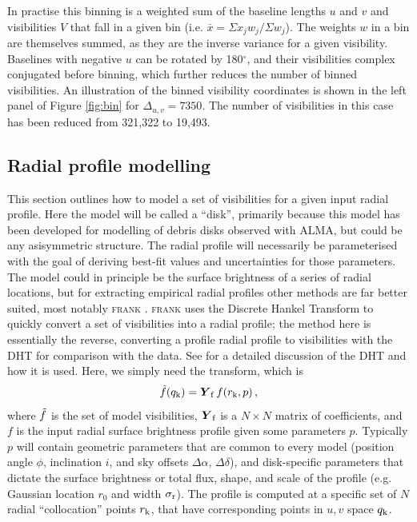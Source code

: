 \documentclass[fleqn,usenatbib]{mnras}
\begin{document}
In practise this binning is a weighted sum of the baseline lengths $u$ and $v$ and visibilities $V$ that fall in a given bin (i.e. $\bar{x} = \Sigma x_j w_j / \Sigma w_j$). The weights $w$ in a bin are themselves summed, as they are the inverse variance for a given visibility. Baselines with negative $u$ can be rotated by 180$^\circ$, and their visibilities complex conjugated before binning, which further reduces the number of binned visibilities. An illustration of the binned visibility coordinates is shown in the left panel of Figure \ref{fig:bin} for $\Delta_{u,v}=7350$. The number of visibilities in this case has been reduced from 321,322 to 19,493.

\subsection{Radial profile modelling}

This section outlines how to model a set of visibilities for a given input radial profile. Here the model will be called a ``disk'', primarily because this model has been developed for modelling of debris disks observed with ALMA, but could be any asisymmetric structure. The radial profile will necessarily be parameterised with the goal of deriving best-fit values and uncertainties for those parameters. The model could in principle be the surface brightness of a series of radial locations, but for extracting empirical radial profiles other methods are far better suited, most notably \textsc{frank} \citep{2020MNRAS.tmp.1491J}. \textsc{frank} uses the Discrete Hankel Transform to quickly convert a set of visibilities into a radial profile; the method here is essentially the reverse, converting a profile radial profile to visibilities with the DHT for comparison with the data. See \citet{2020MNRAS.tmp.1491J} for a detailed discussion of the DHT and how it is used. Here, we simply need the transform, which is
\begin{equation}\label{eq:dht}
    \Tilde{f}(q_{\rm k}) = \boldsymbol{Y}_{\rm f} \, f(r_{\rm k}, p) \, ,
\end{equation}
where $\Tilde{f}$ is the set of model visibilities, $\boldsymbol{Y}_{\rm f}$ is a $N \times N$ matrix of coefficients, and $f$ is the input radial surface brightness profile given some parameters $p$. Typically $p$ will contain geometric parameters that are common to every model (position angle $\phi$, inclination $i$, and sky offsets $\Delta \alpha$, $\Delta \delta$), and disk-specific parameters that dictate the surface brightness or total flux, shape, and scale of the profile (e.g. Gaussian location $r_0$ and width $\sigma_{\rm r}$). The profile is computed at a specific set of $N$ radial ``collocation'' points $r_{\rm k}$, that have corresponding points in $u,v$ space $q_{\rm k}$.
\end{document}
